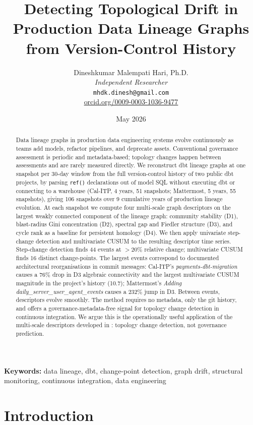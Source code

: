\documentclass[11pt,a4paper]{article}
\title{Detecting Topological Drift in Production Data Lineage Graphs\\
from Version-Control History}
\author{
  Dineshkumar Malempati Hari, Ph.D. \\
  \textit{Independent Researcher} \\
  \texttt{mhdk.dinesh@gmail.com} \\
  \href{https://orcid.org/0009-0003-1036-9477}{orcid.org/0009-0003-1036-9477}
}
\date{May 2026}
\begin{document}
\maketitle

\begin{abstract}
Data lineage graphs in production data engineering systems evolve
continuously as teams add models, refactor pipelines, and deprecate
assets. Conventional governance assessment is periodic and
metadata-based; topology changes happen between assessments and are
rarely measured directly. We reconstruct dbt lineage graphs at one
snapshot per 30-day window from the full version-control history of two
public dbt projects, by parsing \texttt{ref()} declarations out of model
SQL without executing dbt or connecting to a warehouse (Cal-ITP, 4 years, 51 snapshots; Mattermost, 5 years, 55
snapshots), giving 106 snapshots over 9 cumulative years of production
lineage evolution. At each snapshot we compute four multi-scale graph
descriptors on the largest weakly connected component of the lineage
graph: community stability (D1), blast-radius Gini concentration (D2),
spectral gap and Fiedler structure (D3), and cycle rank as a baseline
for persistent homology (D4). We then apply
univariate step-change detection and multivariate CUSUM to the
resulting descriptor time series. Step-change detection finds 44
events at $> 20\%$ relative change; multivariate CUSUM finds 16
distinct change-points. The largest events correspond to documented
architectural reorganisations in commit messages: Cal-ITP's
\textit{payments-dbt-migration} causes a 76\% drop in D3 algebraic
connectivity and the largest multivariate CUSUM magnitude in the
project's history (10.7); Mattermost's
\textit{Adding daily\_server\_user\_agent\_events} causes a 232\%
jump in D3. Between events, descriptors evolve smoothly. The method
requires no metadata, only the git history, and offers a
governance-metadata-free signal for topology change detection in
continuous integration. We argue this is the operationally useful
application of the multi-scale descriptors developed in
\citep{hari2026descriptors}: topology change detection, not
governance prediction.
\end{abstract}

\smallskip
\noindent\textbf{Keywords:} data lineage, dbt, change-point detection,
graph drift, structural monitoring, continuous integration, data engineering

\section{Introduction}
\end{document}
